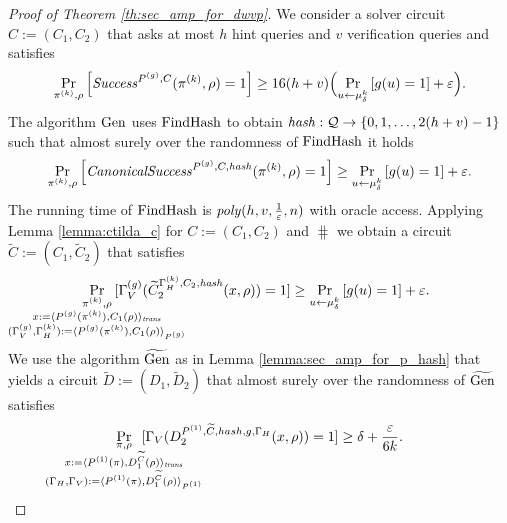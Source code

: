 \begin{proof}[Proof of Theorem \ref{th:sec_amp_for_dwvp}]
%
We consider a solver circuit $C := (C_1, C_2)$ that asks at most $h$ hint queries and $v$ verification queries and satisfies
\begin{align*}
    \underset{\pi^{(k)}, \rho}{\Pr}\left[\operatorname{\mathit{Success}}^{P^{(g)}, C}(\pi^{(k)}, \rho) = 1\right] \geq 16(h+v)\Big(\underset{u \leftarrow \mu_\delta^k}{\Pr}\left[g(u) = 1\right] + \varepsilon\Big).
\end{align*}
The algorithm $\operatorname{\text{Gen}}$ uses $\operatorname{\text{FindHash}}$ to obtain $\operatorname{\mathit{hash}}:\mathcal{Q} \rightarrow \{0,1,\dotsc, 2(h+v)-1\}$ such that almost surely over the randomness of $\operatorname{\text{FindHash}}$ it holds
\begin{align*}
    \underset{\pi^{(k)}, \rho}{\Pr}\left[\operatorname{\mathit{CanonicalSuccess}}^{P^{(g)}, C, \operatorname{\mathit{hash}}}(\pi^{(k)}, \rho) = 1\right] \geq \underset{u \leftarrow \mu_\delta^k}{\Pr}\left[g(u) = 1\right] + \varepsilon.
\end{align*}
The running time of $\operatorname{\text{FindHash}}$ is $\operatorname{\mathit{poly}}(h,v,\frac{1}{\varepsilon},n)$ with oracle access.
Applying Lemma \ref{lemma:ctilda_c} for $C := (C_1, C_2)$ and $\hash$ we obtain a circuit $\widetilde{C} := (C_1, \widetilde{C}_2)$ that satisfies
\begin{align*}
    \underset{
      \mathclap {
      \substack{\pi^{(k)}, \rho \\
        x := \langle P^{(g)}(\pi^{(k)}), C_1(\rho) \rangle_{\mathit{trans}} \\
        (\Gamma_V^{(g)}, \Gamma_H^{(k)}) := \langle P^{(g)}(\pi^{(k)}), C_1(\rho) \rangle_{P^{(g)}}
      }}}
    {\Pr}\mkern13mu[\Gamma_V^{(g)}(\widetilde{C}_2^{\Gamma_H^{(k)}, C_2, \hash}(x, \rho)) = 1]
    \geq
\underset{u \leftarrow \mu_\delta^k}{\Pr}\left[g(u) = 1\right] + \varepsilon.
\end{align*}
We use the algorithm $\widetilde{\operatorname{\text{Gen}}}$ as in Lemma \ref{lemma:sec_amp_for_p_hash} that yields
a circuit $\widetilde{D} := (D_1, \widetilde{D}_2)$ that almost surely over the randomness of $\widetilde{\operatorname{\text{Gen}}}$ satisfies
\begin{align}
  \label{eq:succ_prob_d}
    \underset{
      \mathclap{
      \substack{\pi, \rho \\ x := \langle P^{(1)}(\pi), D_1^{\widetilde{C}}(\rho) \rangle_{\mathit{trans}} \\
        (\Gamma_H, \Gamma_V) := \langle P^{(1)}(\pi), D_1^{\widetilde{C}}(\rho) \rangle_{P^{(1)}}}}}
    {\Pr}\mkern13mu[\Gamma_V(D_2^{P^{(1)}, \widetilde{C}, hash, g, \Gamma_H}(x, \rho)) = 1] \geq \delta + \frac{\epsilon}{6k}.

\end{align}
\end{proof}
